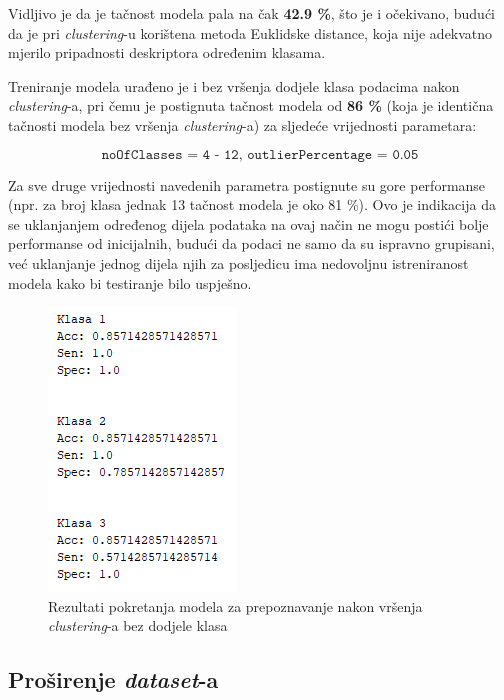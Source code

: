\documentclass[12pt,a4paper]{article}
\begin{document}
Vidljivo je da je tačnost modela pala na čak \textbf{42.9 \%}, što je i očekivano, budući da je pri \textit{clustering}-u korištena metoda Euklidske distance, koja nije adekvatno mjerilo pripadnosti deskriptora određenim klasama.\\

\newpage

Treniranje modela urađeno je i bez vršenja dodjele klasa podacima nakon \textit{clustering}-a, pri čemu je postignuta tačnost modela od \textbf{86 \%} (koja je identična tačnosti modela bez vršenja \textit{clustering}-a) za sljedeće vrijednosti parametara:

\[\texttt{noOfClasses = 4 - 12, outlierPercentage = 0.05}\]

Za sve druge vrijednosti navedenih parametra postignute su gore performanse (npr. za broj klasa jednak 13 tačnost modela je oko 81 \%). Ovo je indikacija da se uklanjanjem određenog dijela podataka na ovaj način ne mogu postići bolje performanse od inicijalnih, budući da podaci ne samo da su ispravno grupisani, već uklanjanje jednog dijela njih za posljedicu ima nedovoljnu istreniranost modela kako bi testiranje bilo uspješno.

\begin{figure}[H]

\center
\includegraphics[scale=0.9]{slikaClustering2.png}
\caption{Rezultati pokretanja modela za prepoznavanje nakon vršenja \textit{clustering}-a bez dodjele klasa}
	
\end{figure}

\newpage

\subsection{Proširenje \textit{dataset}-a}
\end{document}
